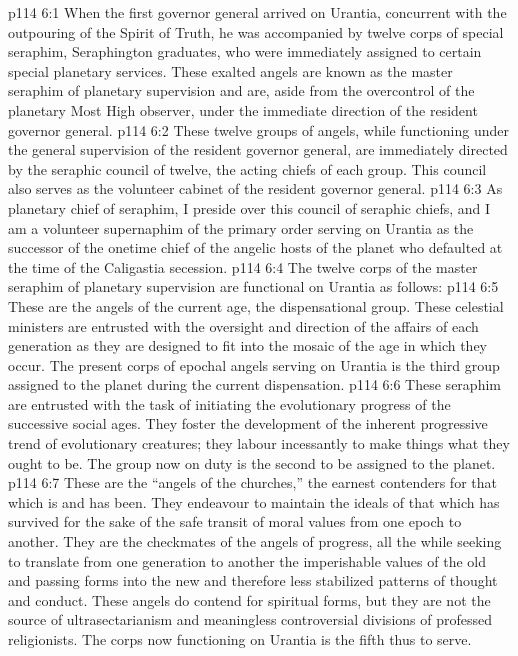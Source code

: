 \vs p114 6:1 When the first governor general arrived on Urantia, concurrent with the outpouring of the Spirit of Truth, he was accompanied by twelve corps of special seraphim, Seraphington graduates, who were immediately assigned to certain special planetary services. These exalted angels are known as the master seraphim of planetary supervision and are, aside from the overcontrol of the planetary Most High observer, under the immediate direction of the resident governor general.
\vs p114 6:2 These twelve groups of angels, while functioning under the general supervision of the resident governor general, are immediately directed by the seraphic council of twelve, the acting chiefs of each group. This council also serves as the volunteer cabinet of the resident governor general.
\vs p114 6:3 As planetary chief of seraphim, I preside over this council of seraphic chiefs, and I am a volunteer supernaphim of the primary order serving on Urantia as the successor of the onetime chief of the angelic hosts of the planet who defaulted at the time of the Caligastia secession.
\vs p114 6:4 The twelve corps of the master seraphim of planetary supervision are functional on Urantia as follows:
\vs p114 6:5 \bibnobreakspace {} These are the angels of the current age, the dispensational group. These celestial ministers are entrusted with the oversight and direction of the affairs of each generation as they are designed to fit into the mosaic of the age in which they occur. The present corps of epochal angels serving on Urantia is the third group assigned to the planet during the current dispensation.
\vs p114 6:6 \bibnobreakspace {} These seraphim are entrusted with the task of initiating the evolutionary progress of the successive social ages. They foster the development of the inherent progressive trend of evolutionary creatures; they labour incessantly to make things what they ought to be. The group now on duty is the second to be assigned to the planet.
\vs p114 6:7 \bibnobreakspace {} These are the “angels of the churches,” the earnest contenders for that which is and has been. They endeavour to maintain the ideals of that which has survived for the sake of the safe transit of moral values from one epoch to another. They are the checkmates of the angels of progress, all the while seeking to translate from one generation to another the imperishable values of the old and passing forms into the new and therefore less stabilized patterns of thought and conduct. These angels do contend for spiritual forms, but they are not the source of ultrasectarianism and meaningless controversial divisions of professed religionists. The corps now functioning on Urantia is the fifth thus to serve.
